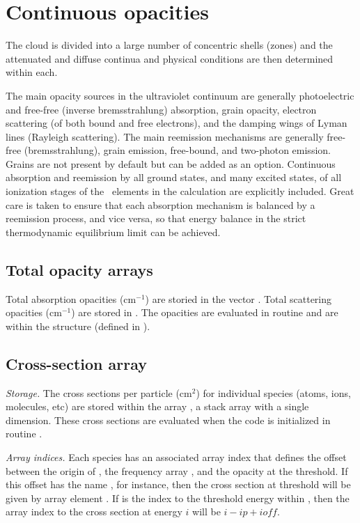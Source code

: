 \section{Continuous opacities}

The cloud is divided into a large number of concentric shells (zones)
and the attenuated and diffuse continua and physical conditions are then
determined within each.

The main opacity sources in the ultraviolet continuum are generally
photoelectric and free-free (inverse bremsstrahlung) absorption,
grain opacity,
electron scattering (of both bound and free electrons), and the damping
wings of Lyman lines (Rayleigh scattering).
The main reemission mechanisms
are generally free-free (bremsstrahlung), grain emission, free-bound, and
two-photon emission.  Grains are not present by default but can be added
as an option.  Continuous absorption and reemission by all ground states,
and many excited states,
of all ionization stages of the \LIMELM\ elements in
the calculation are explicitly included.
Great care is taken to ensure
that each absorption mechanism is balanced by a reemission process, and
vice versa, so that energy balance in the strict thermodynamic equilibrium
limit can be achieved.

\subsection{Total opacity arrays}

Total absorption opacities (cm$^{-1}$) are storied in the vector
.
Total
scattering opacities (cm$^{-1}$) are stored in .
The opacities are
evaluated in routine  and are within the
 structure
(defined in ).

\subsection{Cross-section array}

\emph{Storage.} The cross sections per particle (cm$^2$) for individual species
(atoms, ions, molecules, etc) are stored within the array , a stack
array with a single dimension.  These cross sections are evaluated when
the code is initialized in routine .

\emph{Array indices.}  Each species has an associated array index
that defines
the offset between the origin of ,
the frequency array
, and
the opacity at the threshold.
If this offset has the name , for
instance, then the cross section at threshold will be given by array element
.  If  is the index to the threshold energy within ,
then the array index to the cross section at energy $i$ will be $i-ip+ioff$.

